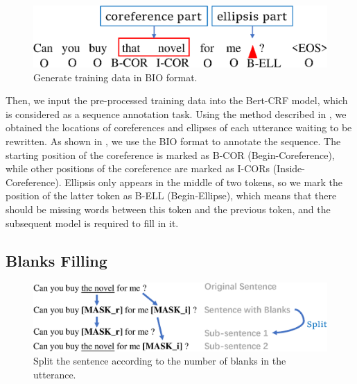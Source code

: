 
\begin{figure}[th]
        \centering
        \includegraphics[width=1.0\columnwidth]{locate-rewrite.eps}
        \caption{Generate training data in BIO format.}
        \label{fig:locate-rewrite}
\end{figure}

Then, we input the pre-processed training data into the Bert-CRF \citep{DBLP:journals/corr/abs-1909-10649} 
model, 
which is considered as a sequence annotation task. 
Using the method described in , we obtained the locations of coreferences 
and ellipses of each utterance waiting to be rewritten. As shown in , 
we use the BIO format to annotate the sequence. The starting position of the coreference is 
marked as B-COR (Begin-Coreference), %
while other positions of the coreference are marked as I-CORs (Inside-Coreference). Ellipsis only appears in the middle of two tokens, so we mark the position of the latter token as B-ELL (Begin-Ellipse), which means that there should be missing words between this token and the previous token, and the subsequent model is required to fill in it.






\subsection{Blanks Filling}
\label{blanks-filling}

\begin{figure}[th]
        \centering
        \includegraphics[width=1.0\columnwidth]{add-split.eps}
        \caption{Split the sentence according to the number of blanks in the utterance.}
        \label{fig:add-split}
\end{figure}


